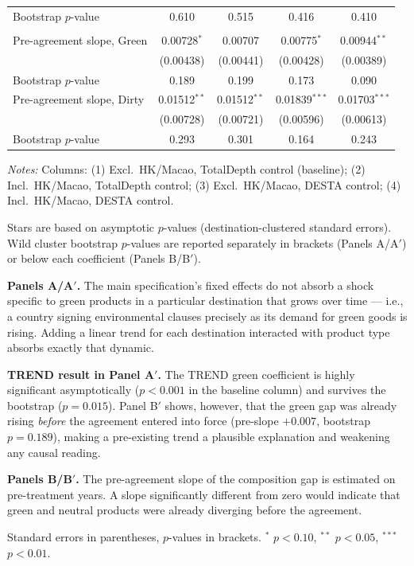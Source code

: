 \begin{table}[htbp]
\begin{threeparttable}
\begin{tabular}{lcccc}
\quad Bootstrap $p$-value & 0.610 & 0.515 & 0.416 & 0.410 \\
\addlinespace
\multicolumn{5}{l}{\textit{Panel B$'$ --- pre-trend test (TREND index)}} \\
\addlinespace
Pre-agreement slope, Green & 0.00728$^{*}$ & 0.00707 & 0.00775$^{*}$ & 0.00944$^{**}$ \\
 & (0.00438) & (0.00441) & (0.00428) & (0.00389) \\
\quad Bootstrap $p$-value & 0.189 & 0.199 & 0.173 & 0.090 \\
\addlinespace
Pre-agreement slope, Dirty & 0.01512$^{**}$ & 0.01512$^{**}$ & 0.01839$^{***}$ & 0.01703$^{***}$ \\
 & (0.00728) & (0.00721) & (0.00596) & (0.00613) \\
\quad Bootstrap $p$-value & 0.293 & 0.301 & 0.164 & 0.243 \\
\bottomrule
\end{tabular}
\begin{tablenotes}[flushleft]\footnotesize
\item \emph{Notes:} Columns: (1) Excl.\ HK/Macao, TotalDepth control (baseline); (2) Incl.\ HK/Macao, TotalDepth control; (3) Excl.\ HK/Macao, DESTA control; (4) Incl.\ HK/Macao, DESTA control.
\item Stars are based on asymptotic $p$-values (destination-clustered standard errors). Wild cluster bootstrap $p$-values are reported separately in brackets (Panels A/A$'$) or below each coefficient (Panels B/B$'$).
\item \textbf{Panels A/A$'$.} The main specification's fixed effects do not absorb a shock specific to green products in a particular destination that grows over time --- i.e., a country signing environmental clauses precisely as its demand for green goods is rising. Adding a linear trend for each destination interacted with product type absorbs exactly that dynamic.
\item \textbf{TREND result in Panel A$'$.} The TREND green coefficient is highly significant asymptotically ($p < 0.001$ in the baseline column) and survives the bootstrap ($p = 0.015$). Panel B$'$ shows, however, that the green gap was already rising \emph{before} the agreement entered into force (pre-slope $+0.007$, bootstrap $p = 0.189$), making a pre-existing trend a plausible explanation and weakening any causal reading.
\item \textbf{Panels B/B$'$.} The pre-agreement slope of the composition gap is estimated on pre-treatment years. A slope significantly different from zero would indicate that green and neutral products were already diverging before the agreement.
\item Standard errors in parentheses, $p$-values in brackets. $^{*}$ $p<0.10$, $^{**}$ $p<0.05$, $^{***}$ $p<0.01$.
\end{tablenotes}
\end{threeparttable}
\end{table}

